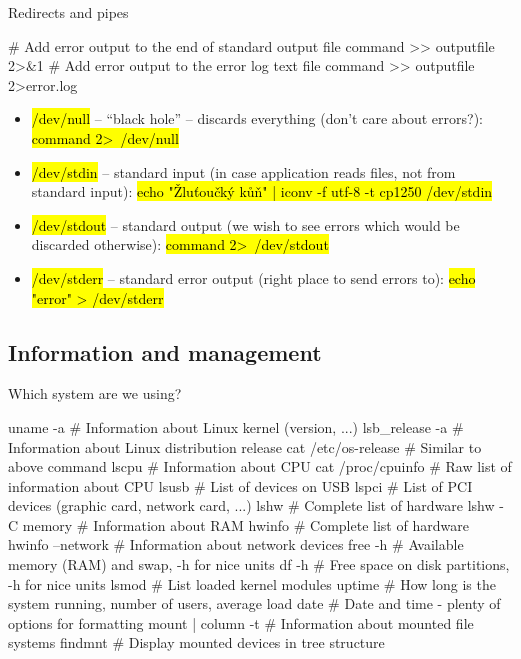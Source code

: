 \documentclass[compress, ucs, xelatex, 11pt, xcolor=svgnames,
  hyperref={
    bookmarks=true,
    unicode=true,
    colorlinks=true,
    pdftitle={Linux, command line and MetaCentrum},
    plainpages=false,
    pdfauthor={Vojtech Zeisek},
    pdfsubject={Course about use of Linux command line, writing shell scripts and using MetaCentrum of CESNET},
    pdfcreator={XeLaTeX},
    pdfkeywords={Linux, GNU, BASH, shell, command line, MetaCentrum},
    linkcolor=Red,
    anchorcolor=Blue,
    citecolor=Purple,
    filecolor=DodgerBlue,
    menucolor=DarkOrchid,
    urlcolor=DeepSkyBlue,
    pdftex},
  url={hyphens, lowtilde} %
  ]{beamer}
\renewcommand{\texttt}[1]{\hl{\ttfamily #1}}
\begin{document}
\begin{frame}[fragile, label=pipe]{Redirects and pipes}
  \begin{bashcode}
    # Add error output to the end of standard output file
    command >> outputfile 2>&1
    # Add error output to the error log text file
    command >> outputfile 2>error.log
  \end{bashcode}
\begin{itemize}
  \item \texttt{/dev/null} -- ``black hole'' -- discards everything (don't care about errors?): \texttt{command 2\textgreater~/dev/null}
  \item \texttt{/dev/stdin} -- standard input (in case application reads files, not from standard input): \texttt{echo "Žluťoučký kůň" | iconv -f utf-8 -t cp1250 /dev/stdin}
  \item \texttt{/dev/stdout} -- standard output (we wish to see errors which would be discarded otherwise): \texttt{command 2\textgreater~/dev/stdout}
  \item \texttt{/dev/stderr} -- standard error output (right place to send errors to): \texttt{echo "error" > /dev/stderr}
\end{itemize}
\end{frame}

\subsection{Information and management}

\begin{frame}[fragile]{Which system are we using?}
  \begin{bashcode}
    uname -a # Information about Linux kernel (version, ...)
    lsb_release -a # Information about Linux distribution release
    cat /etc/os-release # Similar to above command
    lscpu # Information about CPU
    cat /proc/cpuinfo # Raw list of information about CPU
    lsusb # List of devices on USB
    lspci # List of PCI devices (graphic card, network card, ...)
    lshw # Complete list of hardware
    lshw -C memory # Information about RAM
    hwinfo # Complete list of hardware
    hwinfo --network # Information about network devices
    free -h # Available memory (RAM) and swap, -h for nice units
    df -h # Free space on disk partitions, -h for nice units
    lsmod # List loaded kernel modules
    uptime # How long is the system running, number of users, average load
    date # Date and time - plenty of options for formatting
    mount | column -t # Information about mounted file systems
    findmnt # Display mounted devices in tree structure
  \end{bashcode}
\end{frame}
\end{document}

